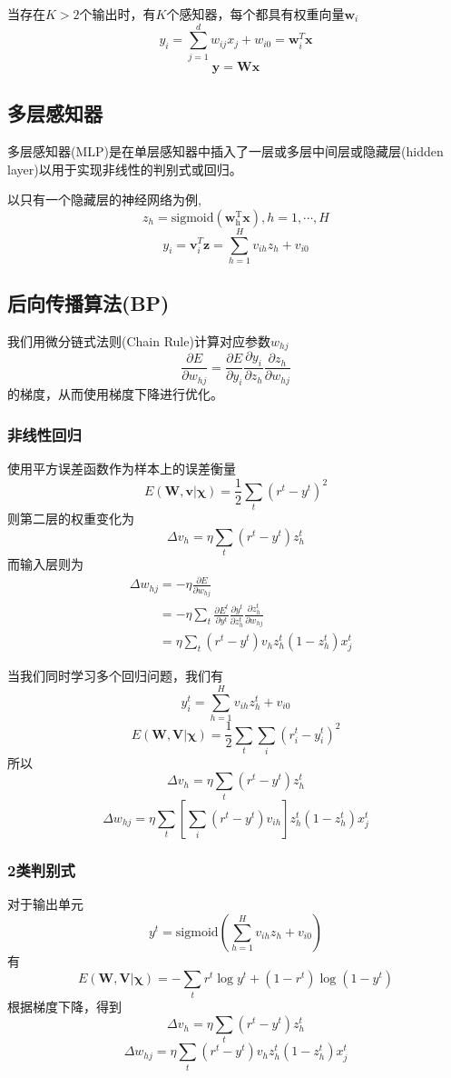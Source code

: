 \documentclass[11pt]{article}
\begin{document}
    		当存在$K > 2$个输出时，有$K$个感知器，每个都具有权重向量$\mathbf{w}_i$
    		\[y_i = \sum_{j = 1}^d w_{ij}x_j + w_{i0} = \mathbf{w}^T_i\mathbf{x}\]
    		\[\mathbf{y} = \mathbf{Wx}\]
    		
    		\subsection{多层感知器}
    			多层感知器(MLP)是在单层感知器中插入了一层或多层中间层或隐藏层(hidden layer)以用于实现非线性的判别式或回归。
    			
    			以只有一个隐藏层的神经网络为例,
    			\[z_h = \mathrm{sigmoid(\mathbf{w}_h^T\mathbf{x})}, h = 1, \cdots, H\]
    			\[y_i = \mathbf{v}_i^T\mathbf{z} = \sum_{h = 1}^H v_{ih}z_{h} + v_{i0}\]
    		\subsection{后向传播算法(BP)}
    			我们用微分链式法则(Chain Rule)计算对应参数$w_{hj}$
    			\[\frac{\partial E}{\partial w_{hj}} = \frac{\partial E}{\partial y_i} \frac{\partial y_i}{\partial z_h} \frac{\partial z_h}{\partial w_{hj}}\]的梯度，从而使用梯度下降进行优化。
    			\subsubsection{非线性回归}
    				使用平方误差函数作为样本上的误差衡量
    				\[E(\mathbf{W, v | \chi}) = \frac{1}{2}\sum_t (r^t - y^t)^2\]
    				则第二层的权重变化为
    				\[\Delta v_h = \eta \sum_t (r^t - y^t)z_h^t\]
    				而输入层则为
    				\begin{align}
    					&\Delta w_{hj} = -\eta \frac{\partial E}{\partial w_{hj}}\nonumber\\
    					&\phantom{\Delta w_{hj}} = -\eta \sum_t  \frac{\partial E^t}{\partial y^t} \frac{\partial y^t}{\partial z_h^t} \frac{\partial z_h^t}{\partial w_{hj}}\nonumber\\
    					&\phantom{\Delta w_{hj}} = \eta \sum_t (r^t - y^t)v_hz_h^t(1 - z_h^t)x_j^t\nonumber
    				\end{align}
    				
    				当我们同时学习多个回归问题，我们有
    				\[y_i^t = \sum_{h = 1}^H v_{ih}z_{h}^t + v_{i0}\]
    				\[E(\mathbf{W, V | \chi}) = \frac{1}{2} \sum_t \sum_i (r_i^t - y_i^t)^2\]
    				所以
    				\[\Delta v_h = \eta \sum_t (r^t - y^t)z_h^t\]
    				\[\Delta w_{hj} = \eta \sum_t \left[\sum_i (r^t - y^t)v_{ih}\right]z_h^t(1 - z_h^t)x_j^t\]
    			\subsubsection{2类判别式}
    				对于输出单元
    				\[y^t = \mathrm{sigmoid}(\sum_{h = 1}^H v_{ih}z_{h} + v_{i0})\]
    				有
    				\[E(\mathbf{W, V | \chi}) = - \sum_t r^t \log y^t + (1 - r^t)\log (1 - y^t)\]
    				根据梯度下降，得到
    				\[\Delta v_h = \eta \sum_t (r^t - y^t)z_h^t\]
    				\[\Delta w_{hj} = \eta \sum_t (r^t - y^t)v_hz_h^t(1 - z_h^t)x_j^t\]
\end{document}
